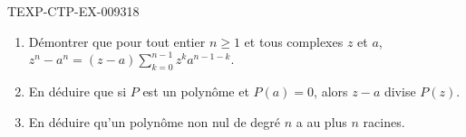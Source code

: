 \begin{exercice}{TEXP-CTP-EX-009}{3}{18}
\begin{enumerate}
  \item Démontrer que pour tout entier $n\geq1$ et tous complexes $z$ et $a$,
        $z^n-a^n=(z-a)\sum_{k=0}^{n-1}z^{k}a^{n-1-k}$.
  \item En déduire que si $P$ est un polynôme et $P(a)=0$, alors $z-a$ divise
        $P(z)$.
  \item En déduire qu'un polynôme non nul de degré $n$ a au plus $n$ racines.
\end{enumerate}
\end{exercice}
